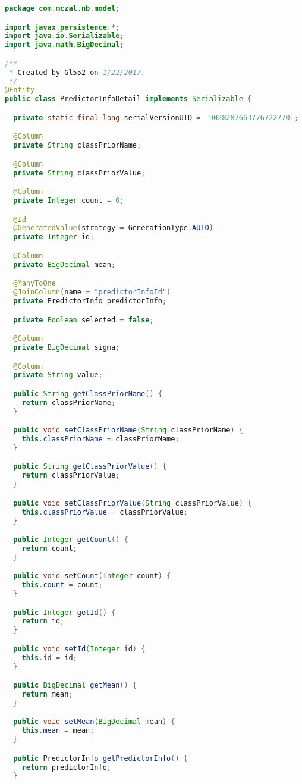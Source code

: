 \begin{lstlisting}[language=Java,basicstyle=\tiny,caption=PredictorInfoDetail.java]
package com.mczal.nb.model;

import javax.persistence.*;
import java.io.Serializable;
import java.math.BigDecimal;

/**
 * Created by Gl552 on 1/22/2017.
 */
@Entity
public class PredictorInfoDetail implements Serializable {

  private static final long serialVersionUID = -9028287663776722770L;

  @Column
  private String classPriorName;

  @Column
  private String classPriorValue;

  @Column
  private Integer count = 0;

  @Id
  @GeneratedValue(strategy = GenerationType.AUTO)
  private Integer id;

  @Column
  private BigDecimal mean;

  @ManyToOne
  @JoinColumn(name = "predictorInfoId")
  private PredictorInfo predictorInfo;

  private Boolean selected = false;

  @Column
  private BigDecimal sigma;

  @Column
  private String value;

  public String getClassPriorName() {
    return classPriorName;
  }

  public void setClassPriorName(String classPriorName) {
    this.classPriorName = classPriorName;
  }

  public String getClassPriorValue() {
    return classPriorValue;
  }

  public void setClassPriorValue(String classPriorValue) {
    this.classPriorValue = classPriorValue;
  }

  public Integer getCount() {
    return count;
  }

  public void setCount(Integer count) {
    this.count = count;
  }

  public Integer getId() {
    return id;
  }

  public void setId(Integer id) {
    this.id = id;
  }

  public BigDecimal getMean() {
    return mean;
  }

  public void setMean(BigDecimal mean) {
    this.mean = mean;
  }

  public PredictorInfo getPredictorInfo() {
    return predictorInfo;
  }


\end{lstlisting}
